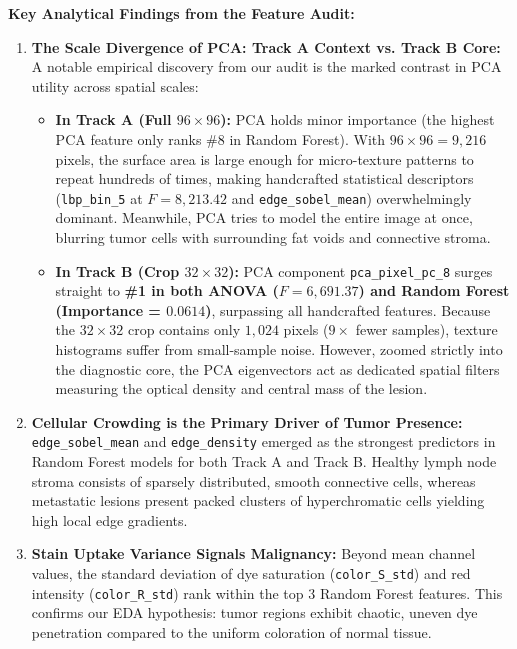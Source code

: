 \documentclass[11pt,a4paper]{article}
\begin{document}
\noindent\textbf{Key Analytical Findings from the Feature Audit:}
\begin{enumerate}
    \item \textbf{The Scale Divergence of PCA: Track A Context vs. Track B Core:}
    A notable empirical discovery from our audit is the marked contrast in PCA utility across spatial scales:
    \begin{itemize}[leftmargin=*, noitemsep]
        \item \textbf{In Track A (Full $96 \times 96$):} PCA holds minor importance (the highest PCA feature only ranks \#8 in Random Forest). With $96 \times 96 = 9,216$ pixels, the surface area is large enough for micro-texture patterns to repeat hundreds of times, making handcrafted statistical descriptors (\texttt{lbp\_bin\_5} at $F = 8,213.42$ and \texttt{edge\_sobel\_mean}) overwhelmingly dominant. Meanwhile, PCA tries to model the entire image at once, blurring tumor cells with surrounding fat voids and connective stroma.
        \item \textbf{In Track B (Crop $32 \times 32$):} PCA component \texttt{pca\_pixel\_pc\_8} surges straight to \textbf{\#1 in both ANOVA ($F = 6,691.37$) and Random Forest (Importance = $0.0614$)}, surpassing all handcrafted features. Because the $32 \times 32$ crop contains only $1,024$ pixels ($9\times$ fewer samples), texture histograms suffer from small-sample noise. However, zoomed strictly into the diagnostic core, the PCA eigenvectors act as dedicated spatial filters measuring the optical density and central mass of the lesion.
    \end{itemize}

    \item \textbf{Cellular Crowding is the Primary Driver of Tumor Presence:}
    \texttt{edge\_sobel\_mean} and \texttt{edge\_density} emerged as the strongest predictors in Random Forest models for both Track A and Track B. Healthy lymph node stroma consists of sparsely distributed, smooth connective cells, whereas metastatic lesions present packed clusters of hyperchromatic cells yielding high local edge gradients.
    
    \item \textbf{Stain Uptake Variance Signals Malignancy:}
    Beyond mean channel values, the standard deviation of dye saturation (\texttt{color\_S\_std}) and red intensity (\texttt{color\_R\_std}) rank within the top 3 Random Forest features. This confirms our EDA hypothesis: tumor regions exhibit chaotic, uneven dye penetration compared to the uniform coloration of normal tissue.
\end{enumerate}
\end{document}
